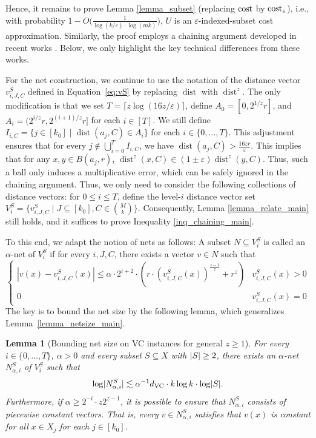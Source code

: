 \documentclass[11pt,letterpaper]{article}
\newtheorem{lemma}[theorem]{Lemma}
\theoremstyle{definition}
\newcommand{\eps}{\varepsilon}
\newcommand{\VC}{\ensuremath{\mathrm{VC}}}
\DeclareMathOperator{\dist}{dist}
\DeclarePairedDelimiter{\abs}{\lvert}{\rvert}
\begin{document}
Hence, it remains to prove Lemma \ref{lemma_subset} (replacing $\cost$ by $\cost_z$), i.e., with probability $1-O\big(\frac{1}{\log(k/\eps)\cdot \log (mk)}\big)$, $U$ is an $\eps$-indexed-subset cost approximation.
%
Similarly, the proof employs a chaining argument developed in recent works \cite{fefferman2016testing,Cohen2022Towards,Cohen25}. 
%
Below, we only highlight the key technical differences from these works.
%

For the net construction, we continue to use the notation of the distance vector \( v^S_{i,J,C} \) defined in Equation~\eqref{eq:vS} by replacing $\dist$ with $\dist^z$.  
%
The only modification is that we set \( T = \lceil z\log(16z/\eps) \rceil \), define \( A_0 = [0, 2^{1/z} r] \), and \( A_i = (2^{i/z} r, 2^{(i+1)/z} r] \) for each \( i \in [T] \).  
%
We still define $I_{i,C}=\{j\in [k_0]\mid \dist(a_j,C)\in A_i\}$ for each $i\in \{0,\dots,T\}$.
%
This adjustment ensures that for every $j\notin \bigcup_{i=0}^T I_{i,C}$, we have $\dist(a_j, C) > \frac{16z r}{\eps}$.
%
This implies that for any $x,y\in B(a_j, r)$, $\dist^z(x, C) \in (1\pm \eps)\dist^z(y, C)$.
%
Thus, such a ball only induces a multiplicative error, which can be safely ignored in the chaining argument.
%
Thus, we only need to consider the following collections of distance vectors: for $0\leq i \leq T$, define the level-$i$ distance vector set $V^S_{i}=\{v^S_{i,J,C}\mid J\subseteq [k_0], C\in \binom{M}{k}\}$.
%
Consequently, Lemma \ref{lemma_relate_main} still holds, and it suffices to prove Inequality \eqref{inq_chaining_main}.
%

To this end, we adapt the notion of nets as follows: A subset $N\subseteq V^S_i$ is called an $\alpha$-net of $V^S_i$ if for every $i,J,C$, there exists a vector $v\in N$ such that
\[
\begin{cases}
|v(x)-v^S_{i,J,C}(x)|\leq \alpha\cdot 2^{i+2}\cdot (r\cdot  (v^S_{i,J,C}(x))^{\frac{z-1}{z}} + r^z) & v^S_{i,J,C}(x)>0\\
0 & v^S_{i,J,C}(x)=0
\end{cases}
\]
%
The key is to bound the net size by the following lemma, which generalizes Lemma~\ref{lemma_netsize_main}.

\begin{lemma}[Bounding net size on VC instances for general $z\geq 1$] 
\label{lemma_netsize_main_kzC}
For every $i\in \{0,\dots,T\}$, $\alpha > 0$ and every subset $S\subseteq X$ with $\abs{S}\geq 2$, there exists an $\alpha$-net $N^S_{\alpha,i}$ of $V^S_i$ such that
\[
\log \abs[big]{N^S_{\alpha,i}} \lesssim \alpha^{-1} d_{\VC}\cdot  k\log k \cdot \log\abs{S}.
\]
Furthermore, if $\alpha\geq 2^{-i}\cdot z2^{z-1}$, it is possible to ensure that $N_{\alpha,i}^S$ consists of piecewise constant vectors. That is, every $v\in N_{\alpha,i}^S$ satisfies that $v(x)$ is constant for all $x\in X_j$ for each $j\in [k_0]$.
\end{lemma}
\end{document}
